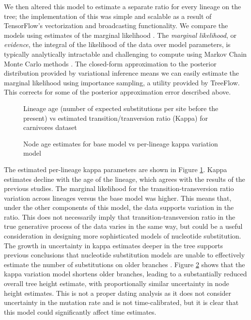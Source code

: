 We then altered this model to estimate a separate ratio for every lineage on the tree; the implementation of this was simple and scalable as a result of TensorFlow's vectorization and broadcasting functionality. We compare the models using estimates of the marginal likelihood \cite{mackay2003information}. The \textit{marginal likelihood}, or \textit{evidence}, the integral of the likelihood of the data over model parameters, is typically analytically intractable and challenging to compute using Markov Chain Monte Carlo methods \cite{xie2011improving}. The closed-form approximation to the posterior distribution provided by variational inference means we can easily estimate the marginal likelihood using importance sampling, a utility provided by TreeFlow. This corrects for some of the posterior approximation error described above.

\begin{figure}
    \centering
    \caption{Lineage age (number of expected substitutions per site before the present) vs estimated transition/tranversion ratio (Kappa) for carnivores dataset}
    \label{fig:carnivoreskappa}
\end{figure}

\begin{figure}
    \centering
    \caption{Node age estimates for base model vs per-lineage kappa variation model}
    \label{fig:carnivorestree}
\end{figure}

The estimated per-lineage kappa parameters are shown in Figure \ref{fig:carnivoreskappa}. Kappa estimates decline with the age of the lineage, which agrees with the results of the previous studies. The marginal likelihood for the transition-transversion ratio variation across lineages versus the base model was higher. This means that, under the other components of this model, the data supports variation in the ratio. This does not necessarily imply that transition-transversion ratio in the true generative process of the data varies in the same way, but could be a useful consideration in designing more sophisticated models of nucleotide substitution. The growth in uncertainty in kappa estimates deeper in the tree supports previous conclusions that nucleotide substitution models are unable to effectively estimate the number of substitutions on older branches \cite{duchene2015declining}. Figure \ref{fig:carnivorestree} shows that the kappa variation model shortens older branches, leading to a substantially reduced overall tree height estimate, with proportionally similar uncertainty in node height estimates. This is not a proper dating analysis as it does not consider uncertainty in the mutation rate and is not time-calibrated, but it is clear that this model could significantly affect time estimates.

